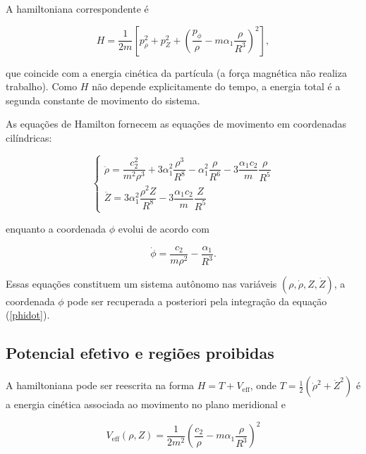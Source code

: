 \documentclass[twocolumn]{rbef}
\begin{document}
A hamiltoniana correspondente é

\begin{equation}\label{hamiltoniana}
    H = \dfrac{1}{2m}\left[p_\rho^2 + p_Z^2 + \left(\dfrac{p_\phi}{\rho} - m\alpha_1\dfrac{\rho}{R^3}\right)^2\right],
\end{equation}

\noindent que coincide com a energia cinética da partícula (a força magnética não realiza trabalho). Como $H$ não depende explicitamente do tempo, a energia total é a segunda constante de movimento do sistema.

As equações de Hamilton fornecem as equações de movimento em coordenadas cilíndricas:

\begin{equation}\label{eqmovimento}
    \begin{cases}
    \ddot{\rho} = \dfrac{c_2^2}{m^2\rho^3} + 3\alpha_1^2\dfrac{\rho^3}{R^8} - \alpha_1^2\dfrac{\rho}{R^6} - 3\dfrac{\alpha_1 c_2}{m}\dfrac{\rho}{R^5}\\[10pt]
    \ddot{Z} = 3\alpha_1^2\dfrac{\rho^2 Z}{R^8} - 3\dfrac{\alpha_1 c_2}{m}\dfrac{Z}{R^5}
    \end{cases}
\end{equation}

\noindent enquanto a coordenada $\phi$ evolui de acordo com

\begin{equation}\label{phidot}
    \dot{\phi} = \dfrac{c_2}{m\rho^2} - \dfrac{\alpha_1}{R^3}.
\end{equation}

Essas equações constituem um sistema autônomo nas variáveis $(\rho, \dot{\rho}, Z, \dot{Z})$, a coordenada $\phi$ pode ser recuperada a posteriori pela integração da equação (\ref{phidot}).

\subsection{Potencial efetivo e regiões proibidas}

A hamiltoniana pode ser reescrita na forma $H = T + V_{\text{eff}}$, onde $T = \frac{1}{2}(\dot{\rho}^2 + \dot{Z}^2)$ é a energia cinética associada ao movimento no plano meridional e

\begin{equation}\label{veff}
    V_{\text{eff}}(\rho, Z) = \dfrac{1}{2m^2}\left(\dfrac{c_2}{\rho} - m\alpha_1\dfrac{\rho}{R^3}\right)^2
\end{equation}
\end{document}
